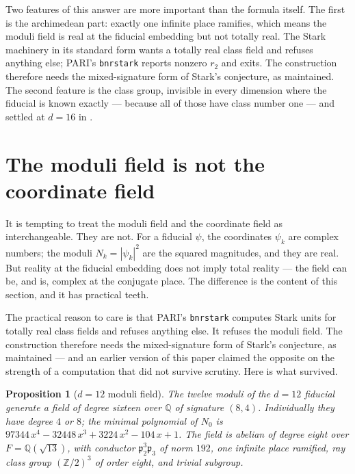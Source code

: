 \documentclass[12pt,a4paper]{article}
\newtheorem{proposition}[theorem]{Proposition}
\newcommand{\Fd}{F}
\newcommand{\pt}{\mathfrak{p}_2}
\begin{document}
Two features of this answer are more important than the formula itself. The first is the archimedean part: exactly one infinite place ramifies, which means the moduli field is real at the fiducial embedding but not totally real. The Stark machinery in its standard form wants a totally real class field and refuses anything else; PARI's \texttt{bnrstark} reports nonzero $r_2$ and exits. The construction therefore needs the mixed-signature form of Stark's conjecture, as \cite{Chrysopoeia2048} maintained. The second feature is the class group, invisible in every dimension where the fiducial is known exactly — because all of those have class number one — and settled at $d=16$ in .

\section{The moduli field is not the coordinate field}
\label{sec:notcoord}

It is tempting to treat the moduli field and the coordinate field as interchangeable. They are not. For a fiducial $\psi$, the coordinates $\psi_k$ are complex numbers; the moduli $N_k = |\psi_k|^2$ are the squared magnitudes, and they are real. But reality at the fiducial embedding does not imply total reality — the field can be, and is, complex at the conjugate place. The difference is the content of this section, and it has practical teeth.

The practical reason to care is that PARI's \texttt{bnrstark} computes Stark units for totally real class fields and refuses anything else. It refuses the moduli field. The construction therefore needs the mixed-signature form of Stark's conjecture, as \cite{Chrysopoeia2048} maintained — and an earlier version of this paper claimed the opposite on the strength of a computation that did not survive scrutiny. Here is what survived.

\begin{proposition}[$d=12$ moduli field]
\label{prop:d12}
The twelve moduli of the $d=12$ fiducial generate a field of degree sixteen over $\mathbb{Q}$ of signature $(8,4)$. Individually they have degree $4$ or $8$; the minimal polynomial of $N_0$ is
$97344\,x^4 - 32448\,x^3 + 3224\,x^2 - 104\,x + 1$. The field is abelian of degree eight over $\Fd = \mathbb{Q}(\sqrt{13})$, with conductor $\pt^3\mathfrak{p}_3$ of norm $192$, \emph{one} infinite place ramified, ray class group $(\mathbb{Z}/2)^3$ of order eight, and trivial subgroup.
\end{proposition}
\end{document}

